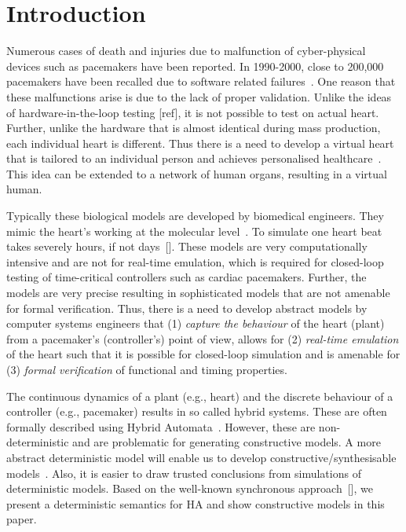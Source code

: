 \section{Introduction}

Numerous cases of death and injuries due to malfunction of 
cyber-physical devices such as  pacemakers have been reported.
In 1990-2000, close to 200,000 pacemakers have been recalled
due to software related failures~\cite{alemzadeh13}.
 One reason that these malfunctions
arise is due to the lack of proper validation.
Unlike the ideas of hardware-in-the-loop testing [ref],
it is not possible to test on actual heart.
Further, unlike the hardware that is almost identical 
during mass production, each individual heart is different.
Thus there is a need to develop a virtual heart that is tailored
to an individual person and achieves
 personalised healthcare~\cite{Trayanova2014}. This idea can be extended 
to a network of human organs, resulting in a virtual human.

Typically these biological  models are  developed by biomedical engineers.
They mimic the heart's working at the
molecular level~\cite{Trayanova2014}. 
To simulate one heart beat takes severely hours, if not days~[].
These models are very computationally intensive and 
are not for real-time emulation,
which is required for closed-loop testing of time-critical 
controllers such as cardiac pacemakers.
Further, the models are 
 very precise resulting in sophisticated models that 
 are not amenable for  formal verification. 
Thus, there is a need to develop abstract models 
by computer systems engineers that  
(1)  \emph{capture the behaviour} of the heart (plant) 
from a pacemaker's (controller's) point of view,
allows for (2) \emph{real-time emulation} of the heart 
such that it is possible for closed-loop simulation and
is amenable for (3) \emph{formal verification} of 
functional and timing properties.


The continuous dynamics of a plant (e.g., heart) and
 the discrete behaviour of a controller (e.g., pacemaker) 
 results in so called hybrid systems. 
 These are often formally described using Hybrid Automata~\cite{alur2015principles,raskin05,chen201487}.
 However, these are non-deterministic and are problematic
 for generating constructive models.
 A more abstract deterministic model will enable us to
 develop constructive/synthesisable models~\cite{Lee2014}. Also, 
 it is easier to draw trusted conclusions from simulations
 of deterministic models. Based on the
 well-known synchronous approach~[], 
 we present a deterministic semantics for \ac{HA} and show
 constructive models in this paper.


